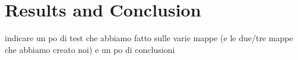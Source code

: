 
\section{Results and Conclusion}
    indicare un po di test che abbiamo fatto sulle varie mappe (e le due/tre mappe che abbiamo creato noi) e un po di conclusioni
    

